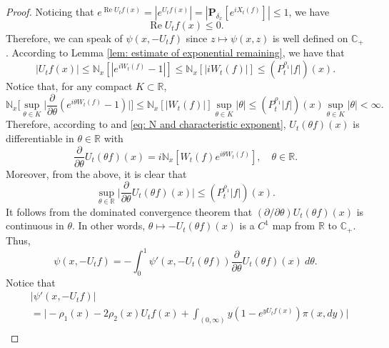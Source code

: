 \documentclass[EJP]{ejpecp} %
\begin{document}
\begin{proof}
	Noticing that $ e^{\operatorname{Re} U_tf(x)} = |e^{U_tf(x)}| = |\mathbf P_{\delta_x}[e^{i X_t(f)}]| \leq 1$, we have
\begin{equation}
\label{eq: -v has positive real part}
	\operatorname{Re} U_tf(x)
    \leq 0.
\end{equation}
	Therefore, we can speak of $\psi(x,-U_tf)$ since $z\mapsto \psi(x,z)$ is well defined on $\mathbb C_+$.
	According to Lemma \ref{lem: estimate of exponential remaining}, we have that
\begin{equation}
\label{eq: upper bound for vf}
    |U_tf(x)|
    \leq \mathbb N_x[|e^{i W_t(f)} - 1|]
    \leq \mathbb N_x[|i W_t(f)|]
    \leq (P^{\rho_1}_t |f|)(x).
\end{equation}
Notice that, for any compact $K \subset \mathbb R$,
\begin{equation}
\label{eq: estimate of deriavetive of v(theta)}
    \mathbb N_x \Big[\sup_{\theta \in K} \Big|\frac{\partial}{\partial \theta} (e^{i\theta W_t(f)} - 1) \Big|\Big]
    \leq \mathbb N_x[|W_t(f)|] \sup_{\theta \in K}|\theta|
    \leq (P^{\rho_1}_t |f|)(x) \sup_{\theta \in K}|\theta| < \infty.
\end{equation}
	Therefore, according to \cite[Theorem A.5.2]{Durrett2010Probability} and \eqref{eq: N and characteristic exponent}, $ U_t( \theta f)( x )$ is differentiable in $\theta \in \mathbb R$ with
\[
    \frac{\partial}{\partial \theta} U_t(\theta f)(x)
    = i\mathbb N_x[W_t(f) e^{i\theta W_t(f)}],
    \quad \theta \in \mathbb R.
\]
	Moreover, from the above, it is clear that
\begin{equation}
\label{eq: upper bounded for derivative of v(theta)}
	\sup_{\theta \in \mathbb R}\Big| \frac{\partial}{\partial \theta}U_t(\theta f)(x)\Big|
    \leq ( P^{\rho_1}_t |f|)(x).
\end{equation}
	It follows from the dominated convergence theorem that $(\partial/\partial \theta)U_t(\theta f)(x)$ is continuous in $\theta$.
	In other words, $\theta \mapsto -U_t(\theta f)(x)$ is a $C^1$ map from $\mathbb R$ to $\mathbb C_+$.
	Thus,
\begin{equation}
\label{eq: path integration representation of psi(v)}
    \psi(x,-U_tf)
    = -\int_0^1 \psi' (x,-U_t(\theta f) ) \frac{\partial}{\partial \theta} U_t(\theta f)(x)~d\theta.
\end{equation}
	Notice that
\begin{align}
    & |\psi'(x, -U_tf)| \\
    & = \Big| -\rho_1(x)- 2\rho_2(x) U_tf(x)+ \int_{(0,\infty)} y (1- e^{y U_tf(x)} ) \pi(x,dy)\Big| \\

\end{align}
\end{proof}
\end{document}
